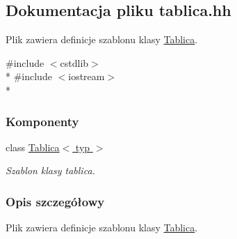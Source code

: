 \hypertarget{tablica_8hh}{\subsection{Dokumentacja pliku tablica.\-hh}
\label{tablica_8hh}
}


Plik zawiera definicje szablonu klasy \hyperlink{class_tablica}{Tablica}.  


{\ttfamily \#include $<$cstdlib$>$}\\*
{\ttfamily \#include $<$iostream$>$}\\*
\subsubsection*{Komponenty}
\begin{DoxyCompactItemize}
\item 
class \hyperlink{class_tablica}{Tablica$<$ typ $>$}
\begin{DoxyCompactList}\small\item\em Szablon klasy tablica. \end{DoxyCompactList}\end{DoxyCompactItemize}


\subsubsection{Opis szczegółowy}
Plik zawiera definicje szablonu klasy \hyperlink{class_tablica}{Tablica}. 